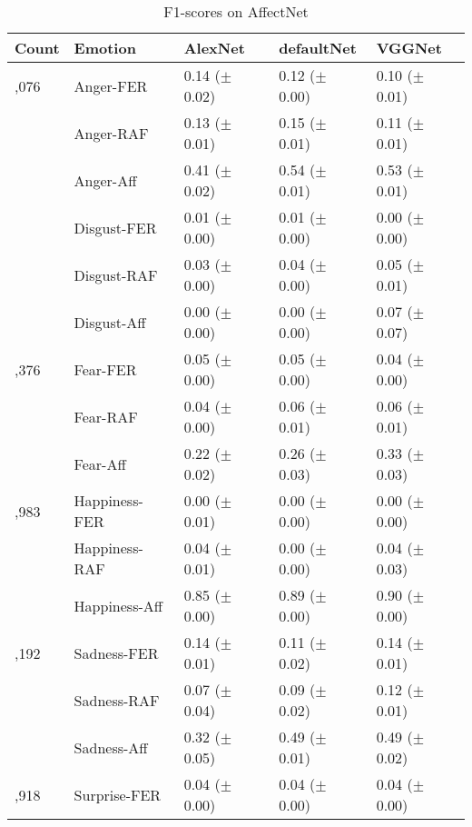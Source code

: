 \documentclass[a4paper, conference]{IEEEtran}
\begin{document}
\begin{table}[htbp]
	\caption{F1-scores on AffectNet}
	\begin{center}
		\begin{tabular}{>{\raggedleft\arraybackslash}p{0.7cm}p{1.82cm}p{1.55cm}p{1.55cm}p{1.55cm}@{}} %
			\hline
			\hline %
			Count & Emotion & AlexNet & defaultNet & VGGNet \\
			\hline
			\hline
			5,076 & Anger-FER & 0.14 ($\pm$ 0.02) & 0.12 ($\pm$ 0.00) & 0.10 ($\pm$ 0.01) \\
			      & Anger-RAF & 0.13 ($\pm$ 0.01) & 0.15 ($\pm$ 0.01) & 0.11 ($\pm$ 0.01) \\
			      & Anger-Aff & 0.41 ($\pm$ 0.02) & 0.54 ($\pm$ 0.01) & 0.53 ($\pm$ 0.01) \\
			\hline %
			861 & Disgust-FER & 0.01 ($\pm$ 0.00) & 0.01 ($\pm$ 0.00) & 0.00 ($\pm$ 0.00) \\
			    & Disgust-RAF & 0.03 ($\pm$ 0.00) & 0.04 ($\pm$ 0.00) & 0.05 ($\pm$ 0.01) \\
			    & Disgust-Aff & 0.00 ($\pm$ 0.00) & 0.00 ($\pm$ 0.00) & 0.07 ($\pm$ 0.07) \\
			\hline %
			1,376 & Fear-FER & 0.05 ($\pm$ 0.00) & 0.05 ($\pm$ 0.00) & 0.04 ($\pm$ 0.00) \\
			      & Fear-RAF & 0.04 ($\pm$ 0.00) & 0.06 ($\pm$ 0.01) & 0.06 ($\pm$ 0.01) \\
			      & Fear-Aff & 0.22 ($\pm$ 0.02) & 0.26 ($\pm$ 0.03) & 0.33 ($\pm$ 0.03) \\
			\hline %
			26,983 & Happiness-FER & 0.00 ($\pm$ 0.01) & 0.00 ($\pm$ 0.00) & 0.00 ($\pm$ 0.00) \\
			       & Happiness-RAF & 0.04 ($\pm$ 0.01) & 0.00 ($\pm$ 0.00) & 0.04 ($\pm$ 0.03) \\
			       & Happiness-Aff & 0.85 ($\pm$ 0.00) & 0.89 ($\pm$ 0.00) & 0.90 ($\pm$ 0.00) \\
			\hline %
			5,192 & Sadness-FER & 0.14 ($\pm$ 0.01) & 0.11 ($\pm$ 0.02) & 0.14 ($\pm$ 0.01) \\
			      & Sadness-RAF & 0.07 ($\pm$ 0.04) & 0.09 ($\pm$ 0.02) & 0.12 ($\pm$ 0.01) \\
			      & Sadness-Aff & 0.32 ($\pm$ 0.05) & 0.49 ($\pm$ 0.01) & 0.49 ($\pm$ 0.02) \\
			\hline %
			2,918 & Surprise-FER & 0.04 ($\pm$ 0.00) & 0.04 ($\pm$ 0.00) & 0.04 ($\pm$ 0.00) \\

\end{tabular}
\end{center}
\end{table}
\end{document}
